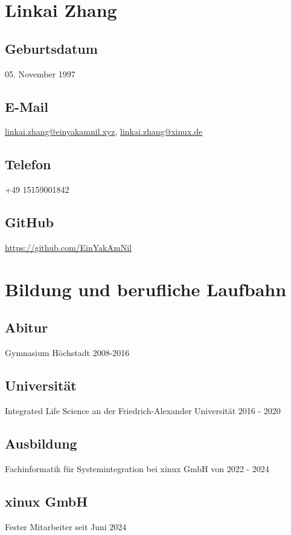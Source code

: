\documentclass{article}
\begin{document}
\author{Linkai Zhang}

\section{Linkai Zhang}

\subsection{Geburtsdatum}
05. November 1997

\subsection{E-Mail}
\href{mailto:linkai.zhang@einyamkamnil.xyz}{linkai.zhang@einyakamnil.xyz},
\href{mailto:linkai.zhang@xinux.de}{linkai.zhang@xinux.de}

\subsection{Telefon}
+49 15159001842

\subsection{GitHub}
\href{https://github.com/EinYakAmNil}{https://github.com/EinYakAmNil}

\section{Bildung und berufliche Laufbahn}

\subsection{Abitur}
Gymnasium Höchstadt 2008-2016

\subsection{Universität}
Integrated Life Science an der Friedrich-Alexander Universität 2016 - 2020

\subsection{Ausbildung}
Fachinformatik für Systemintegration bei xinux GmbH von 2022 - 2024

\subsection{xinux GmbH}
Fester Mitarbeiter seit Juni 2024
\end{document}
